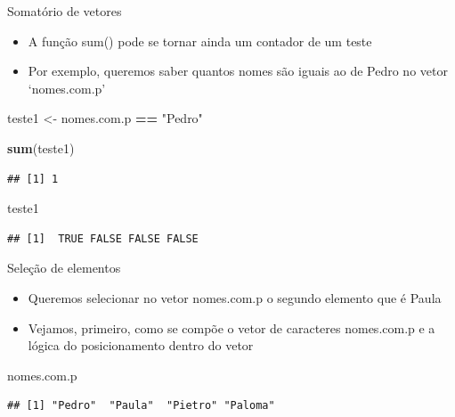 \documentclass[
  10pt,
  ignorenonframetext,
]{beamer}
\newenvironment{Shaded}{\begin{snugshade}}{\end{snugshade}}
\newcommand{\KeywordTok}[1]{\textcolor[rgb]{0.13,0.29,0.53}{\textbf{#1}}}
\newcommand{\NormalTok}[1]{#1}
\newcommand{\OperatorTok}[1]{\textcolor[rgb]{0.81,0.36,0.00}{\textbf{#1}}}
\newcommand{\StringTok}[1]{\textcolor[rgb]{0.31,0.60,0.02}{#1}}
\providecommand{\tightlist}{%
  \setlength{\itemsep}{0pt}\setlength{\parskip}{0pt}}
\begin{document}
\begin{frame}[fragile]{Somatório de vetores}
\protect\hypertarget{somatuxf3rio-de-vetores-1}{}
\begin{itemize}
\tightlist
\item
  A função sum() pode se tornar ainda um contador de um teste
\item
  Por exemplo, queremos saber quantos nomes são iguais ao de Pedro no
  vetor `nomes.com.p'
\end{itemize}

\begin{Shaded}
\begin{Highlighting}[]
\NormalTok{teste1 \textless{}{-}}\StringTok{ }\NormalTok{nomes.com.p }\OperatorTok{==}\StringTok{ "Pedro"}

\KeywordTok{sum}\NormalTok{(teste1)}
\end{Highlighting}
\end{Shaded}

\begin{verbatim}
## [1] 1
\end{verbatim}

\begin{Shaded}
\begin{Highlighting}[]
\NormalTok{teste1}
\end{Highlighting}
\end{Shaded}

\begin{verbatim}
## [1]  TRUE FALSE FALSE FALSE
\end{verbatim}
\end{frame}

\begin{frame}[fragile]{Seleção de elementos}
\protect\hypertarget{seleuxe7uxe3o-de-elementos}{}
\begin{itemize}
\tightlist
\item
  Queremos selecionar no vetor nomes.com.p o segundo elemento que é
  Paula
\item
  Vejamos, primeiro, como se compõe o vetor de caracteres nomes.com.p e
  a lógica do posicionamento dentro do vetor
\end{itemize}

\begin{Shaded}
\begin{Highlighting}[]
\NormalTok{nomes.com.p}
\end{Highlighting}
\end{Shaded}

\begin{verbatim}
## [1] "Pedro"  "Paula"  "Pietro" "Paloma"
\end{verbatim}
\end{frame}
\end{document}
